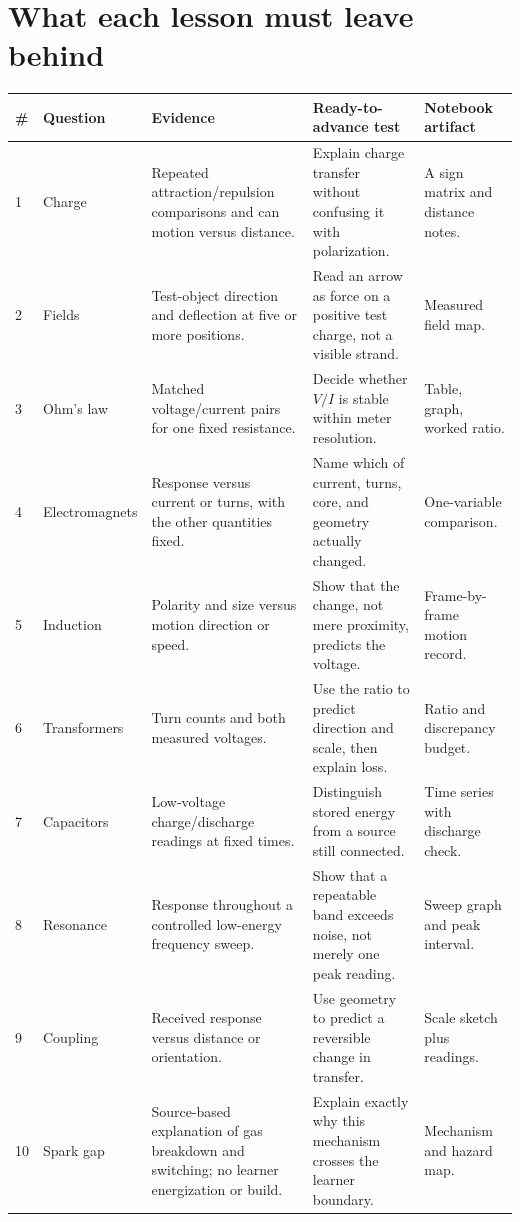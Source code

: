 \newpage
{}
\section{What each lesson must leave behind}
\small
\begin{longtable}{@{}p{.055\linewidth}p{.15\linewidth}p{.25\linewidth}p{.25\linewidth}p{.215\linewidth}@{}}
\toprule
\textbf{\#}&\textbf{Question}&\textbf{Evidence}&\textbf{Ready-to-advance test}&\textbf{Notebook artifact}\\
\midrule
1&Charge&Repeated attraction/repulsion comparisons and can motion versus
distance.&Explain charge transfer without confusing it with polarization.&A
sign matrix and distance notes.\\
2&Fields&Test-object direction and deflection at five or more positions.&Read
an arrow as force on a positive test charge, not a visible strand.&Measured
field map.\\
3&Ohm's law&Matched voltage/current pairs for one fixed resistance.&Decide
whether $V/I$ is stable within meter resolution.&Table, graph, worked ratio.\\
4&Electromagnets&Response versus current or turns, with the other quantities
fixed.&Name which of current, turns, core, and geometry actually changed.&One-variable comparison.\\
5&Induction&Polarity and size versus motion direction or speed.&Show that the
change, not mere proximity, predicts the voltage.&Frame-by-frame motion record.\\
6&Transformers&Turn counts and both measured voltages.&Use the ratio to predict
direction and scale, then explain loss.&Ratio and discrepancy budget.\\
7&Capacitors&Low-voltage charge/discharge readings at fixed times.&Distinguish
stored energy from a source still connected.&Time series with discharge check.\\
8&Resonance&Response throughout a controlled low-energy frequency sweep.&Show
that a repeatable band exceeds noise, not merely one peak reading.&Sweep graph
and peak interval.\\
9&Coupling&Received response versus distance or orientation.&Use geometry to
predict a reversible change in transfer.&Scale sketch plus readings.\\
10&Spark gap&Source-based explanation of gas breakdown and switching; no
learner energization or build.&Explain exactly why this mechanism crosses the
learner boundary.&Mechanism and hazard map.\\
\bottomrule
\end{longtable}
\normalsize

